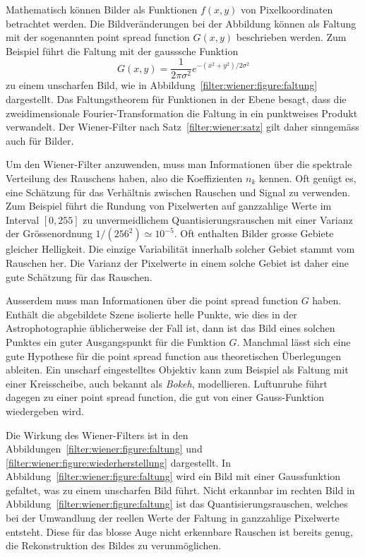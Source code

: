 Mathematisch können Bilder als Funktionen $f(x,y)$ von Pixelkoordinaten 
betrachtet werden.
Die Bildveränderungen bei der Abbildung können als Faltung mit der sogenannten
point spread function $G(x,y)$ beschrieben werden.
Zum Beispiel führt die Faltung mit der gausssche Funktion
\[
G(x,y) = \frac{1}{2\pi\sigma^2} e^{-(x^2+y^2)/2\sigma^2}
\]
zu einem unscharfen Bild, wie in Abbildung~\ref{filter:wiener:figure:faltung}
dargestellt.
Das Faltungstheorem für Funktionen in der Ebene besagt, dass die
zweidimensionale Fourier-Transformation die Faltung in ein punktweises
Produkt verwandelt.
Der Wiener-Filter nach Satz~\ref{filter:wiener:satz} gilt daher sinngemäss
auch für Bilder.

Um den Wiener-Filter anzuwenden, muss man Informationen über die spektrale
Verteilung des Rauschens haben, also die Koeffizienten $n_k$ kennen.
Oft genügt es, eine Schätzung für das Verhältnis zwischen Rauschen und
Signal zu verwenden.
Zum Beispiel führt die Rundung von Pixelwerten auf ganzzahlige Werte im
Interval $[0,255]$ zu unvermeidlichem Quantisierungsrauschen mit einer
Varianz der Grössenordnung $1/(256^2)\simeq 10^{-5}$.
Oft enthalten Bilder grosse Gebiete gleicher Helligkeit.
Die einzige Variabilität innerhalb solcher Gebiet stammt vom Rauschen her.
Die Varianz der Pixelwerte in einem solche Gebiet ist daher eine gute
Schätzung für das Rauschen.

Ausserdem muss man Informationen über die point spread function $G$ haben.
Enthält die abgebildete Szene isolierte helle Punkte, wie dies in der
Astrophotographie üblicherweise der Fall ist, dann ist das Bild
eines solchen Punktes ein guter Ausgangspunkt für die Funktion $G$.
Manchmal lässt sich eine gute Hypothese für die point spread function
aus theoretischen Überlegungen ableiten.
Ein unscharf eingestelltes Objektiv kann zum Beispiel als Faltung mit
einer Kreisscheibe, auch bekannt als {\em Bokeh}, modellieren.
Luftunruhe führt dagegen zu einer point spread function, die gut
von einer Gauss-Funktion wiedergeben wird.

Die Wirkung des Wiener-Filters ist in den
Abbildungen~\ref{filter:wiener:figure:faltung} und
\ref{filter:wiener:figure:wiederherstellung} dargestellt.
In Abbildung~\ref{filter:wiener:figure:faltung} wird ein Bild
mit einer Gaussfunktion gefaltet, was zu einem unscharfen Bild führt.
Nicht erkannbar im rechten Bild in Abbildung~\ref{filter:wiener:figure:faltung}
ist das Quantisierungsrauschen, welches bei der Umwandlung der
reellen Werte der Faltung in ganzzahlige Pixelwerte entsteht.
Diese für das blosse Auge nicht erkennbare Rauschen ist bereits
genug, die Rekonstruktion des Bildes zu verunmöglichen.

